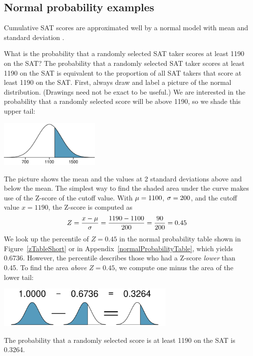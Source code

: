 \D{\newpage}

\subsection{Normal probability examples}

Cumulative SAT scores are approximated well by a normal model with mean \satmean{} and standard deviation \satsd{}.

\begin{examplewrap}
\begin{nexample}{What is the probability that a randomly selected SAT taker scores at least 1190 on the SAT?}\label{satAbove1190Exam}
The probability that a randomly selected SAT taker scores at least 1190 on the SAT is equivalent to the proportion of all SAT takers that score at least 1190 on the SAT. First, always draw and label a picture of the normal distribution. (Drawings need not be exact to be useful.) We are interested in the probability that a randomly selected score will be above 1190, so we shade this upper tail:
\begin{center}
\includegraphics[height=0.9in]{ch_distributions/figures/satAbove1190/satAbove1190}
\end{center}
The picture shows the mean and the values at 2 standard deviations above and below the mean. The simplest way to find the shaded area under the curve makes use of the Z-score of the cutoff value. With $\mu=1100{}$, $\sigma=200{}$, and the cutoff value $x=1190$, the Z-score is computed as
\begin{eqnarray*}
Z = \frac{x - \mu}{\sigma} = \frac{1190 - 1100{}}{200{}} = \frac{90}{200} = 0.45
\end{eqnarray*}
We look up the percentile of $Z=0.45$ in the normal probability table shown in Figure~\ref{zTableShort} or in Appendix~\vref{normalProbabilityTable}, which yields 0.6736. However, the percentile describes those who had a Z-score \emph{lower} than 0.45. To find the area \emph{above} $Z=0.45$, we compute one minus the area of the lower tail:
\begin{center}
\includegraphics[height=0.8in]{ch_distributions/figures/subtractingArea/subtractingArea}
\end{center}
The probability that a randomly selected score is at least 1190 on the SAT is 0.3264.
\end{nexample}
\end{examplewrap}

